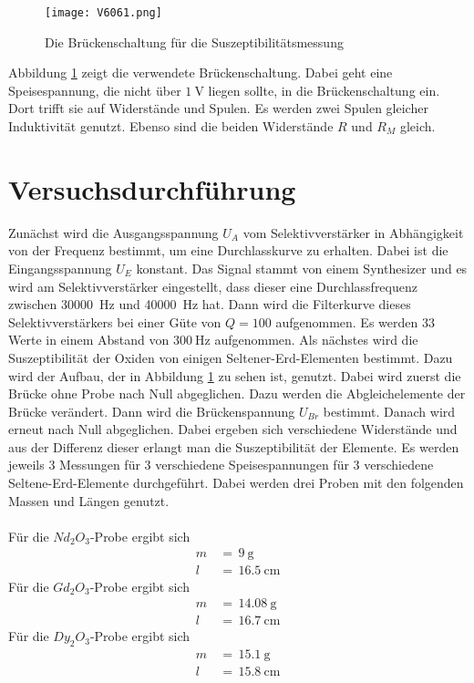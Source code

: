 \documentclass[
  bibliography=totoc,     %
  captions=tableheading,  %
  titlepage=firstiscover, %
]{scrartcl}
\begin{document}
\begin{figure}[H]
  \centering
  \texttt{[image: V6061.png]}
  \caption{Die Brückenschaltung für die Suszeptibilitätsmessung \cite{anleitung}}
  \label{fig:V6063}
\end{figure}
\noindent
Abbildung \ref{fig:V6063} zeigt die verwendete Brückenschaltung. Dabei geht
eine Speisespannung, die nicht über $\SI{1}{\volt}$ liegen sollte, in die
Brückenschaltung ein. Dort trifft sie auf Widerstände und Spulen. Es werden
zwei Spulen gleicher Induktivität genutzt. Ebenso sind die beiden Widerstände
$R$ und $R_M$ gleich.
\section{Versuchsdurchführung}
\label{sec:durchführung}
Zunächst wird die Ausgangsspannung $U_A$ vom Selektivverstärker in Abhängigkeit
von der Frequenz bestimmt, um eine Durchlasskurve zu erhalten. Dabei ist die
Eingangsspannung $U_E$ konstant. Das Signal stammt von einem Synthesizer und
es wird am Selektivverstärker eingestellt, dass dieser eine Durchlassfrequenz
zwischen \SI{30000}{\hertz} und \SI{40000}{\hertz} hat. Dann wird die
Filterkurve dieses Selektivverstärkers bei einer Güte von $Q=100$ aufgenommen.
Es werden 33 Werte in einem Abstand von $\SI{300}{\hertz}$ aufgenommen.
Als nächstes wird die Suszeptibilität der Oxiden von einigen
Seltener-Erd-Elementen bestimmt. Dazu wird der Aufbau, der in Abbildung
\ref{fig:V6063} zu sehen ist, genutzt. Dabei wird zuerst die Brücke ohne
Probe nach Null abgeglichen. Dazu werden die Abgleichelemente der Brücke
verändert. Dann wird die Brückenspannung $U_{Br}$ bestimmt. Danach wird
erneut nach Null abgeglichen. Dabei ergeben sich verschiedene Widerstände
und aus der Differenz dieser erlangt man die Suszeptibilität der Elemente.
Es werden jeweils 3 Messungen für 3 verschiedene Speisespannungen für 3
verschiedene Seltene-Erd-Elemente durchgeführt.
\noindent
Dabei werden drei Proben mit den folgenden Massen und Längen genutzt. \\
\\
Für die $Nd_2O_3$-Probe ergibt sich
\begin{align*}
  m\,&=\,\SI{9}{\gram} \\
  l\,&=\,\SI{16.5}{\centi\meter}
\end{align*}
Für die $Gd_2O_3$-Probe ergibt sich
\begin{align*}
  m\,&=\,\SI{14.08}{\gram} \\
  l\,&=\,\SI{16.7}{\centi\meter}
\end{align*}
Für die $Dy_2O_3$-Probe ergibt sich
\begin{align*}
  m\,&=\,\SI{15.1}{\gram} \\
  l\,&=\,\SI{15.8}{\centi\meter}
\end{align*}
\end{document}

